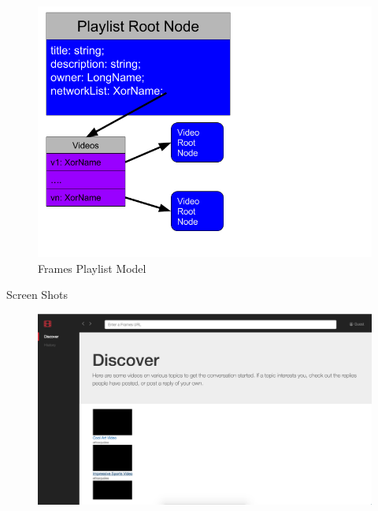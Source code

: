 \documentclass[final]{beamer}
\newlength{\onecolwid}
\newlength{\twocolwid}
\begin{document}
\begin{frame}[t]
\begin{columns}[t]
\begin{column}{\twocolwid}
\begin{columns}[t,totalwidth=\twocolwid]
\begin{column}{\onecolwid}
\begin{block}{}
  \begin{figure}
  \includegraphics[width=0.8\linewidth]{playlist-model.png}
  \caption{Frames Playlist Model}
  \label{fig:playlist-model}
  \end{figure}

\end{block}

\begin{block}{Screen Shots}

  \begin{figure}
  \includegraphics[width=0.8\linewidth]{discover-page.png}
  \captionsetup{labelformat=empty}
  \label{fig:discover-page}
  \end{figure}

\end{block}

\end{column} %

\end{columns} %



\end{column}
\end{columns}
\end{frame}
\end{document}
